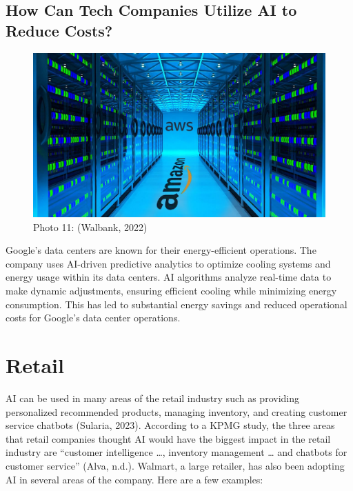 \documentclass[
]{article}
\begin{document}
\hypertarget{how-can-tech-companies-utilize-ai-to-reduce-costs}{%
\subsection{How Can Tech Companies Utilize AI to Reduce Costs?}\label{how-can-tech-companies-utilize-ai-to-reduce-costs}}

\begin{figure}
\centering
\includegraphics{tech4.png}
\caption{Photo 11: (Walbank, 2022)}
\end{figure}

Google's data centers are known for their energy-efficient operations. The company uses AI-driven predictive analytics to optimize cooling systems and energy usage within its data centers. AI algorithms analyze real-time data to make dynamic adjustments, ensuring efficient cooling while minimizing energy consumption. This has led to substantial energy savings and reduced operational costs for Google's data center operations.

\hypertarget{retail}{%
\section{Retail}\label{retail}}

AI can be used in many areas of the retail industry such as providing personalized recommended products, managing inventory, and creating customer service chatbots (Sularia, 2023). According to a KPMG study, the three areas that retail companies thought AI would have the biggest impact in the retail industry are ``customer intelligence \ldots, inventory management \ldots{} and chatbots for customer service'' (Alva, n.d.). Walmart, a large retailer, has also been adopting AI in several areas of the company. Here are a few examples:
\end{document}
